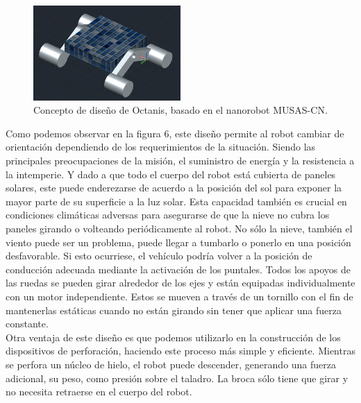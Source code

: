 \documentclass[a4paper,12pt]{article}
\begin{document}
\begin{figure}[h!]
	\centering
    \includegraphics[width=0.5\textwidth]{conceptrover}
    \caption{Concepto de diseño de Octanis, basado en el nanorobot MUSAS-CN.}
\end{figure}

Como podemos observar en la figura 6, este diseño permite al robot cambiar de orientación dependiendo de los requerimientos de la situación. Siendo las principales preocupaciones de la misión, el suministro de energía y la resistencia a la intemperie. Y dado a que todo el cuerpo del robot está cubierta de paneles solares, este puede enderezarse de acuerdo a la posición del sol para exponer la mayor parte de su superficie a la luz solar. Esta capacidad también es crucial en condiciones climáticas adversas para asegurarse de que la nieve no cubra los paneles girando o volteando periódicamente al robot. No sólo la nieve, también el viento puede ser un problema, puede llegar a tumbarlo o ponerlo en una posición desfavorable. Si esto ocurriese, el vehículo podría volver a la posición de conducción adecuada mediante la activación de los puntales. Todos los apoyos de las ruedas se pueden girar alrededor de los ejes y están equipadas individualmente con un motor independiente. Estos se mueven a través de un tornillo con el fin de mantenerlas estáticas cuando no están girando sin tener que aplicar una fuerza constante. \\
Otra ventaja de este diseño es que podemos utilizarlo en la construcción de los dispositivos de perforación, haciendo este proceso más simple y eficiente. Mientras se perfora un núcleo de hielo, el robot puede descender, generando una fuerza adicional, su peso, como presión sobre el taladro. La broca sólo tiene que girar y no necesita retraerse en el cuerpo del robot.
\end{document}
